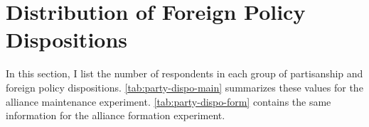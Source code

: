 \documentclass[12pt]{article}
\begin{document}
%
%
%
%
%
%
%
%
%
%


\section{Distribution of Foreign Policy Dispositions}

In this section, I list the number of respondents in each group of partisanship and foreign policy dispositions. 
\autoref{tab:party-dispo-main} summarizes these values for the alliance maintenance experiment. 
\autoref{tab:party-dispo-form} contains the same information for the alliance formation experiment. 
\end{document}
